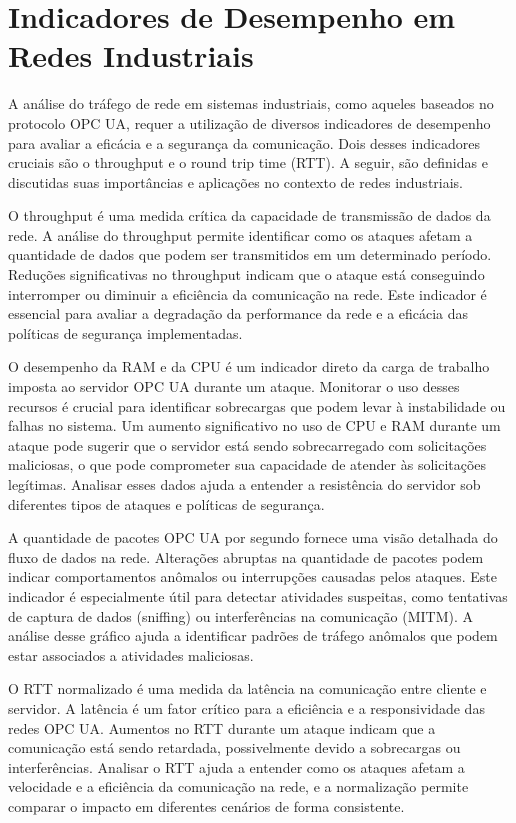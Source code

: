     {\color{red}
    \section{Indicadores de Desempenho em Redes Industriais}

    A análise do tráfego de rede em sistemas industriais, como aqueles baseados no protocolo OPC UA, requer a utilização de diversos indicadores de desempenho para avaliar a eficácia e a segurança da comunicação. Dois desses indicadores cruciais são o throughput e o round trip time (RTT). A seguir, são definidas e discutidas suas importâncias e aplicações no contexto de redes industriais.

    {\color{red}O throughput é uma medida crítica da capacidade de transmissão de dados da rede. A análise do throughput permite identificar como os ataques afetam a quantidade de dados que podem ser transmitidos em um determinado período. Reduções significativas no throughput indicam que o ataque está conseguindo interromper ou diminuir a eficiência da comunicação na rede. Este indicador é essencial para avaliar a degradação da performance da rede e a eficácia das políticas de segurança implementadas.

    O desempenho da RAM e da CPU é um indicador direto da carga de trabalho imposta ao servidor OPC UA durante um ataque. Monitorar o uso desses recursos é crucial para identificar sobrecargas que podem levar à instabilidade ou falhas no sistema. Um aumento significativo no uso de CPU e RAM durante um ataque pode sugerir que o servidor está sendo sobrecarregado com solicitações maliciosas, o que pode comprometer sua capacidade de atender às solicitações legítimas. Analisar esses dados ajuda a entender a resistência do servidor sob diferentes tipos de ataques e políticas de segurança.

    A quantidade de pacotes OPC UA por segundo fornece uma visão detalhada do fluxo de dados na rede. Alterações abruptas na quantidade de pacotes podem indicar comportamentos anômalos ou interrupções causadas pelos ataques. Este indicador é especialmente útil para detectar atividades suspeitas, como tentativas de captura de dados (sniffing) ou interferências na comunicação (MITM). A análise desse gráfico ajuda a identificar padrões de tráfego anômalos que podem estar associados a atividades maliciosas.

    O RTT normalizado é uma medida da latência na comunicação entre cliente e servidor. A latência é um fator crítico para a eficiência e a responsividade das redes OPC UA. Aumentos no RTT durante um ataque indicam que a comunicação está sendo retardada, possivelmente devido a sobrecargas ou interferências. Analisar o RTT ajuda a entender como os ataques afetam a velocidade e a eficiência da comunicação na rede, e a normalização permite comparar o impacto em diferentes cenários de forma consistente.

}}
